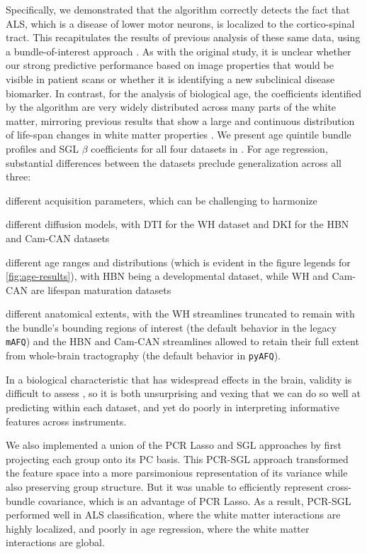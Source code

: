 \documentclass[10pt,letterpaper]{article}
\begin{document}
Specifically, we demonstrated that the algorithm correctly detects the fact
that ALS, which is a disease of lower motor neurons, is localized to the
cortico-spinal tract. This recapitulates the results of previous analysis of
these same data, using a bundle-of-interest approach
\cite{sarica2017corticospinal}.
As with the original study, it is unclear whether our strong predictive performance based on image properties that would be visible in patient scans or whether it is identifying a new subclinical disease biomarker.
In contrast, for the analysis of biological
age, the coefficients identified by the algorithm are very widely distributed
across many parts of the white matter, mirroring previous results that show a
large and continuous distribution of life-span changes in white matter
properties \cite{yeatman2014lifespan}.
We present age quintile bundle profiles and SGL \protect$\beta$ coefficients for all four datasets in . For age regression, substantial differences between the datasets preclude generalization across all three:
\begin{enumerate*}[%
    label=(\roman*),%
    before=\unskip{: },%
    itemjoin={{, }},%
    itemjoin*={{, and }}]
    \item different acquisition parameters, which can be challenging to harmonize \cite{pinto2020harmonization}
    \item different diffusion models, with DTI for the WH dataset and DKI for the HBN and Cam-CAN datasets
    \item different age ranges and distributions (which is evident in the figure legends for \cref{fig:age-results}), with HBN being a developmental dataset, while WH and Cam-CAN are lifespan maturation datasets
    \item different anatomical extents, with the WH streamlines truncated to remain with the bundle's bounding regions of interest (the default behavior in the legacy \texttt{mAFQ}) and the HBN and Cam-CAN streamlines allowed to retain their full extent from whole-brain tractography (the default behavior in \texttt{pyAFQ}).
\end{enumerate*}
In a biological characteristic that has widespread effects in the brain, validity is difficult to assess \cite{lermausabiaga2019replication}, so it is both unsurprising and vexing that we can do so well at predicting within each dataset, and yet do poorly in interpreting informative features across instruments.


We also implemented a union of the PCR Lasso and SGL approaches by first
projecting each group onto its PC basis. This PCR-SGL approach transformed the feature
space into a more parsimonious representation of its variance while
also preserving group structure. But it was unable to efficiently represent
cross-bundle covariance, which is an advantage of PCR Lasso. As a result, PCR-SGL performed well in ALS classification,
where the white matter interactions are highly localized, and poorly
in age regression, where the white matter interactions are global.
\end{document}
